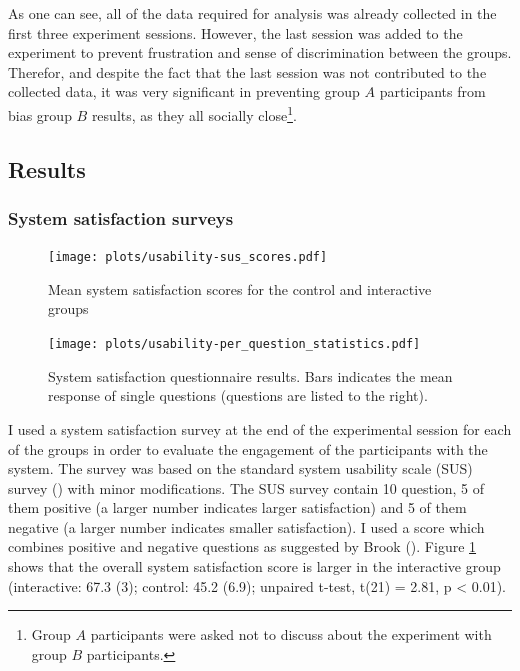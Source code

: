 \documentclass[a4paper,11pt]{article}
\begin{document}
{As one can see, all of the data required for analysis was already collected in the first three experiment sessions.
However, the last session was added to the experiment to prevent frustration and sense of discrimination between the groups.
Therefor, and despite the fact that the last session was not contributed to the collected data, it was very significant in preventing group $A$ participants from bias group $B$ results, as they all socially close\footnote{Group $A$ participants were asked not to discuss about the experiment with group $B$ participants.}.

\subsection{Results}

\subsubsection{System satisfaction surveys}

\begin{figure}[!htb]
    \centering
    \texttt{[image: plots/usability-sus\_scores.pdf]}
    \caption{Mean system satisfaction scores for the control and interactive groups}\label{plot:usability-sus_scores}
\end{figure}

\begin{figure}[!htb]
    \centering
    \texttt{[image: plots/usability-per\_question\_statistics.pdf]}
    \caption{System satisfaction questionnaire results. Bars indicates the mean response of single questions (questions are listed to the right).}\label{plot:usability-per_question_statistics}
\end{figure}

I used a system satisfaction survey at the end of the experimental session for each of the groups in order to evaluate the engagement of the participants with the system.
The survey was based on the standard system usability scale (SUS) survey (\cite{brooke96}) with minor modifications.
The SUS survey contain 10 question, 5 of them positive (a larger number indicates larger satisfaction) and 5 of them negative (a larger number indicates smaller satisfaction).
I used a score which combines positive and negative questions as suggested by Brook (\cite*{brooke96}).
Figure \ref{plot:usability-sus_scores} shows that the overall system satisfaction score is larger in the interactive group (interactive: 67.3 (3); control: 45.2 (6.9); unpaired t-test, t(21) = 2.81, p \textless{} 0.01).

}
\end{document}
